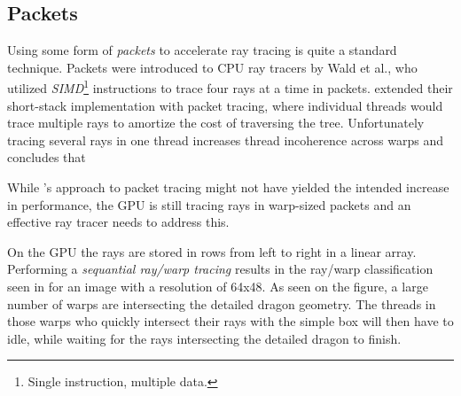 \subsection{Packets}


Using some form of \textit{packets} to accelerate ray tracing is quite a
standard technique. Packets were introduced to CPU ray tracers by Wald et
al., who utilized \textit{SIMD}\footnote{Single
  instruction, multiple data.} instructions to trace four rays at a time in
packets. \horn{} extended their short-stack implementation with packet tracing,
where individual threads would trace multiple rays to amortize the cost of
traversing the tree. Unfortunately tracing several rays in one thread increases
thread incoherence across warps and \aila{} concludes that




While \horn's approach to packet tracing might not have yielded the intended
increase in performance, the GPU is still tracing rays in warp-sized packets and
an effective ray tracer needs to address this.

On the GPU the rays are stored in rows from left to right in a linear
array. Performing a \textit{sequantial ray/warp tracing} results in the ray/warp
classification seen in  for an image with a
resolution of 64x48. As seen on the figure, a large number of warps are
intersecting the detailed dragon geometry. The threads in those warps who
quickly intersect their rays with the simple box will then have to idle, while
waiting for the rays intersecting the detailed dragon to finish.

